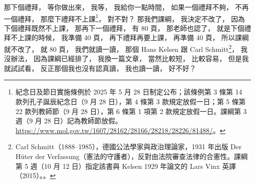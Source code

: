 \hypertarget{w02:cue:2846}{}那下個禮拜，
\hypertarget{w02:cue:2847}{}等你做出來，
\hypertarget{w02:cue:2848}{}我等，
\hypertarget{w02:cue:2849}{}我給你一點時間，
\hypertarget{w02:cue:2850}{}如果一個禮拜不夠，
\hypertarget{w02:cue:2851}{}不再一個禮拜，
\hypertarget{w02:cue:2852}{}那麼下禮拜不上課\footnote{紀念日及節日實施條例於 2025 年 5 月 28 日制定公布；該條例第 3 條第 14 款列孔子誕辰紀念日（9 月 28 日），第 4 條第 3 款規定放假一日；第 5 條第 22 款列教師節（9 月 28 日），第 6 條第 1 項第 2 款規定放假一日。課綱第 3 週（9 月 28 日）記為教師節放假。\url{https://www.mol.gov.tw/1607/28162/28166/28218/28226/81488/}。}，
\hypertarget{w02:cue:2853}{}對不對？
\hypertarget{w02:cue:2854}{}那我們課綱，
\hypertarget{w02:cue:2855}{}我決定不改了，
\hypertarget{w02:cue:2856}{}因為下個禮拜既然不上課，
\hypertarget{w02:cue:2857}{}那再下一個禮拜，
\hypertarget{w02:cue:2858}{}有 80 頁，
\hypertarget{w02:cue:2859}{}那老師也認了，
\hypertarget{w02:cue:2860}{}就是下個禮拜不上課的時候，
\hypertarget{w02:cue:2861}{}我準備 40 頁，
\hypertarget{w02:cue:2862}{}再下禮拜再要上課，
\hypertarget{w02:cue:2863}{}再準備 40 頁，
\hypertarget{w02:cue:2864}{}所以課綱就不改了，
\hypertarget{w02:cue:2865}{}就 80 頁，
\hypertarget{w02:cue:2866}{}我們就讀一讀，
\hypertarget{w02:cue:2867}{}那個 Hans Kelsen 跟 Carl Schmitt\footnote{Carl Schmitt（1888–1985），德國公法學家與政治理論家，1931 年出版 Der Hüter der Verfassung（憲法的守護者），反對由法院審查法律的合憲性。課綱第 5 週（10 月 12 日）指定該書與 Kelsen 1929 年論文的 Lars Vinx 英譯（2015）。\cite{schmitt2015}。}，
\hypertarget{w02:cue:2868}{}我沒辦法，
\hypertarget{w02:cue:2869}{}因為課綱已經排了，
\hypertarget{w02:cue:2870}{}我換一篇文章，
\hypertarget{w02:cue:2871}{}當然比較短，
\hypertarget{w02:cue:2872}{}比較容易，
\hypertarget{w02:cue:2873}{}但是我就試試看，
\hypertarget{w02:cue:2874}{}反正那個我也沒有認真讀，
\hypertarget{w02:cue:2875}{}我也讀一讀，
\hypertarget{w02:cue:2876}{}好不好？

